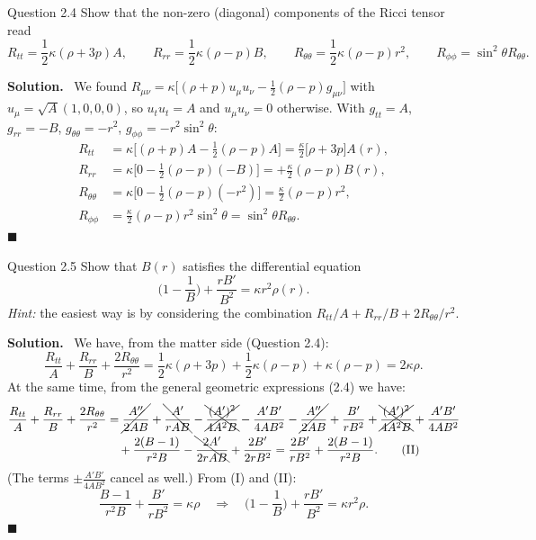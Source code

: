 \documentclass[11pt,a4paper]{article}
\numberwithin{equation}{subsection}
\newenvironment{solution}{\par\noindent\textbf{\textcolor{excol!70!black}{Solution.}}\ }{\hfill$\blacksquare$\par\medskip}
\begin{document}
\begin{problem}{Question 2.4}
Show that the non-zero (diagonal) components of the Ricci tensor read
\[
  R_{tt}=\frac12\kappa(\rho+3p)A,\qquad R_{rr}=\frac12\kappa(\rho-p)B,\qquad R_{\theta\theta}=\frac12\kappa(\rho-p)r^2,\qquad R_{\phi\phi}=\sin^2\theta R_{\theta\theta}. \tag{2.6--2.9}
\]
\end{problem}
\begin{solution}
We found $R_{\mu\nu}=\kappa\big[(\rho+p)u_\mu u_\nu-\frac12(\rho-p)g_{\mu\nu}\big]$ with $u_\mu=\sqrt{A}(1,0,0,0)$, so $u_tu_t=A$ and $u_\mu u_\nu=0$ otherwise. With $g_{tt}=A$, $g_{rr}=-B$, $g_{\theta\theta}=-r^2$, $g_{\phi\phi}=-r^2\sin^2\theta$:
\begin{align*}
  R_{tt}&=\kappa\Big[(\rho+p)A-\frac12(\rho-p)A\Big]=\frac\kappa2\big[\rho+3p\big]A(r),\\
  R_{rr}&=\kappa\Big[0-\frac12(\rho-p)(-B)\Big]=+\frac\kappa2(\rho-p)B(r),\\
  R_{\theta\theta}&=\kappa\Big[0-\frac12(\rho-p)(-r^2)\Big]=\frac\kappa2(\rho-p)r^2,\\
  R_{\phi\phi}&=\frac\kappa2(\rho-p)r^2\sin^2\theta=\sin^2\theta R_{\theta\theta}.
\end{align*}
\end{solution}

\begin{problem}{Question 2.5}
Show that $B(r)$ satisfies the differential equation
\[
  \Big(1-\frac1B\Big)+\frac{rB'}{B^2}=\kappa r^2\rho(r). \tag{2.10}
\]
\emph{Hint:} the easiest way is by considering the combination $R_{tt}/A+R_{rr}/B+2R_{\theta\theta}/r^2$.
\end{problem}
\begin{solution}
We have, from the matter side (Question 2.4):
\[
  \frac{R_{tt}}{A}+\frac{R_{rr}}{B}+\frac{2R_{\theta\theta}}{r^2}=\frac12\kappa(\rho+3p)+\frac12\kappa(\rho-p)+\kappa(\rho-p)=2\kappa\rho .\tag{I}
\]
At the same time, from the general geometric expressions (2.4) we have:
\begin{align*}
  \frac{R_{tt}}{A}+\frac{R_{rr}}{B}+\frac{2R_{\theta\theta}}{r^2}
  &=\cancel{\frac{A''}{2AB}}+\bcancel{\frac{A'}{rAB}}-\xcancel{\frac{(A')^2}{4A^2B}}-\frac{A'B'}{4AB^2}
  -\cancel{\frac{A''}{2AB}}+\frac{B'}{rB^2}+\xcancel{\frac{(A')^2}{4A^2B}}+\frac{A'B'}{4AB^2}\\
  &\quad+\frac{2(B-1)}{r^2B}-\bcancel{\frac{2A'}{2rAB}}+\frac{2B'}{2rB^2}
  =\frac{2B'}{rB^2}+\frac{2(B-1)}{r^2B}.\tag{II}
\end{align*}
(The terms $\pm\frac{A'B'}{4AB^2}$ cancel as well.) From (I) and (II):
\[
  \frac{B-1}{r^2B}+\frac{B'}{rB^2}=\kappa\rho\quad\Longrightarrow\quad\Big(1-\frac1B\Big)+\frac{rB'}{B^2}=\kappa r^2\rho .
\]
\end{solution}
\end{document}
